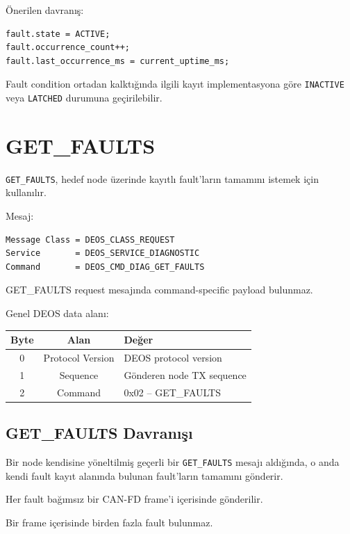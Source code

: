 \documentclass[a4paper,11pt]{article}
\begin{document}
Önerilen davranış:

\begin{lstlisting}
fault.state = ACTIVE;
fault.occurrence_count++;
fault.last_occurrence_ms = current_uptime_ms;
\end{lstlisting}

Fault condition ortadan kalktığında ilgili kayıt implementasyona göre
\texttt{INACTIVE} veya \texttt{LATCHED} durumuna geçirilebilir.

\section{GET\_FAULTS}

\texttt{GET\_FAULTS}, hedef node üzerinde kayıtlı fault'ların tamamını
istemek için kullanılır.

Mesaj:

\begin{lstlisting}
Message Class = DEOS_CLASS_REQUEST
Service       = DEOS_SERVICE_DIAGNOSTIC
Command       = DEOS_CMD_DIAG_GET_FAULTS
\end{lstlisting}

GET\_FAULTS request mesajında command-specific payload bulunmaz.

Genel DEOS data alanı:

\begin{center}
\begin{tabular}{c c l}
\toprule
\textbf{Byte} & \textbf{Alan} & \textbf{Değer} \\
\midrule
0 & Protocol Version & DEOS protocol version \\
1 & Sequence         & Gönderen node TX sequence \\
2 & Command          & 0x02 -- GET\_FAULTS \\
\bottomrule
\end{tabular}
\end{center}

\subsection{GET\_FAULTS Davranışı}

Bir node kendisine yöneltilmiş geçerli bir
\texttt{GET\_FAULTS} mesajı aldığında, o anda kendi fault kayıt
alanında bulunan fault'ların tamamını gönderir.

Her fault bağımsız bir CAN-FD frame'i içerisinde gönderilir.

Bir frame içerisinde birden fazla fault bulunmaz.
\end{document}
